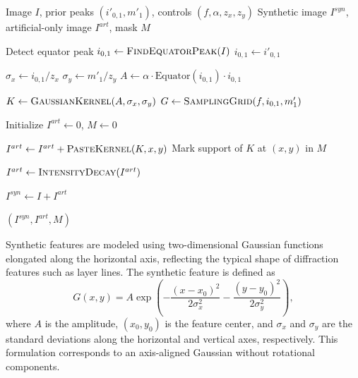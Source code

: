 \documentclass[iucr]{iucrjournals}
\begin{document}
\begin{algorithm}[htbp]
\centering
\begin{minipage}{0.96\columnwidth}
\begin{algorithmic}[1]

\Require Image $I$, prior peaks $(i'_{0,1}, m'_1)$, controls $(f, \alpha, z_x, z_y)$
\Ensure Synthetic image $I^{syn}$, artificial-only image $I^{art}$, mask $M$

\State Detect equator peak $i_{0,1} \leftarrow \textsc{FindEquatorPeak}(I)$
    \State $i_{0,1} \leftarrow i'_{0,1}$
\EndIf

\State $\sigma_x \leftarrow i_{0,1} / z_x$
\State $\sigma_y \leftarrow m'_1 / z_y$
\State $A \leftarrow \alpha \cdot \text{Equator}(i_{0,1}) \cdot i_{0,1}$

\State $K \leftarrow \textsc{GaussianKernel}(A, \sigma_x, \sigma_y)$
\State $G \leftarrow \textsc{SamplingGrid}(f, i_{0,1}, m'_1)$

\State Initialize $I^{art} \leftarrow 0$, $M \leftarrow 0$

    \State $I^{art} \leftarrow I^{art} + \textsc{PasteKernel}(K, x, y)$
    \State Mark support of $K$ at $(x,y)$ in $M$
\EndFor

\State $I^{art} \gets \textsc{IntensityDecay}(I^{art})$

\State $I^{syn} \leftarrow I + I^{art}$

\State \Return $(I^{syn}, I^{art}, M)$

\end{algorithmic}
\end{minipage}
\caption{Procedure for synthetic-feature generation and mask construction used for validation in the absence of ground-truth background.}
\label{alg:synthetic_signal}
\end{algorithm}


Synthetic features are modeled using two-dimensional Gaussian functions elongated along the horizontal axis, reflecting the typical shape of diffraction features such as layer lines. The synthetic feature is defined as
\begin{equation}
G(x, y) = A \exp\!\left(
-\frac{(x-x_0)^2}{2\sigma_x^2}
-\frac{(y-y_0)^2}{2\sigma_y^2}
\right),
\end{equation}
where $A$ is the amplitude, $(x_0, y_0)$ is the feature center, and $\sigma_x$ and $\sigma_y$ are the standard deviations along the horizontal and vertical axes, respectively. This formulation corresponds to an axis-aligned Gaussian without rotational components.
\end{document}
